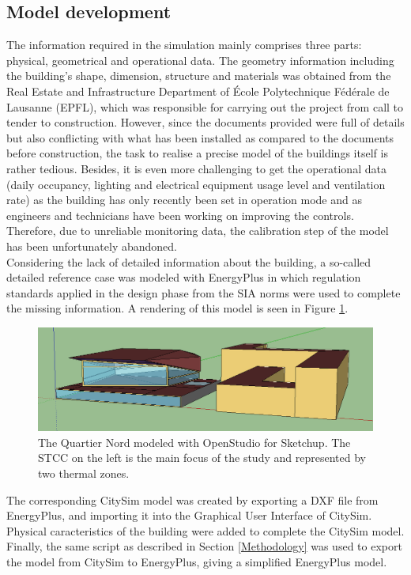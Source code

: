 \documentclass{tBPS2e}
\theoremstyle{plain}
\theoremstyle{definition}
\theoremstyle{remark}
\begin{document}
\subsection{Model development}
The information required in the simulation mainly comprises three parts: physical, geometrical and operational data. The geometry information including the building’s shape, dimension, structure and materials was obtained from the Real Estate and Infrastructure Department of École Polytechnique Fédérale de Lausanne (EPFL), which was responsible for carrying out the project from call to tender to construction. However, since the documents provided were full of details but also conflicting with what has been installed as compared to the documents before construction, the task to realise a precise model of the buildings itself is rather tedious. Besides, it is even more challenging to get the operational data (daily occupancy, lighting and electrical equipment usage level and ventilation rate) as the building has only recently been set in operation mode and as engineers and technicians have been working on improving the controls. Therefore, due to unreliable monitoring data, the calibration step of the model has been unfortunately abandoned.\\

Considering the lack of detailed information about the building, a so-called detailed reference case was modeled with EnergyPlus \citep{Mauree:2015} in which regulation standards applied in the design phase from the SIA norms were used to complete the missing information. A rendering of this model is seen in Figure \ref{fig:model_yang}.

\begin{figure}[H]
\centering
\includegraphics[width=\textwidth]{figures/model_yang}
\caption{The Quartier Nord modeled with OpenStudio for Sketchup. The STCC on the left is the main focus of the study and represented by two thermal zones.}
\label{fig:model_yang}
\end{figure}

The corresponding CitySim model was created by exporting a DXF file from EnergyPlus, and importing it into the Graphical User Interface of CitySim. Physical caracteristics of the building were added to complete the CitySim model. Finally, the same script as described in Section \ref{Methodology} was used to export the model from CitySim to EnergyPlus, giving a simplified EnergyPlus model.\\
\end{document}
